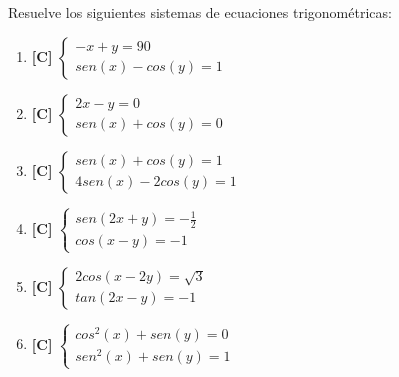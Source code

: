 \Exercicio Resuelve los siguientes sistemas de ecuaciones trigonométricas:

\begin{enumerate}[topsep=0pt]
	\item \textbf{[C]} $ \begin{cases}
		-x + y = 90 \\
		sen(x) - cos(y)= 1
	\end{cases} $
	\item \textbf{[C]} $ \begin{cases}
		2x - y = 0 \\
		sen(x) + cos(y)= 0
	\end{cases} $
	\item \textbf{[C]} $ \begin{cases}
		sen(x) + cos(y) = 1 \\
		4 sen(x) - 2cos(y) = 1
	\end{cases} $
	\item \textbf{[C]} $ \begin{cases}
		sen(2x+y) = -\frac{1}{2} \\
		cos(x-y) = -1
	\end{cases} $
	\item \textbf{[C]} $ \begin{cases}
		2cos(x-2y) = \sqrt{3} \\
		tan(2x-y) = -1
	\end{cases} $
	\item \textbf{[C]} $ \begin{cases}
		cos^2(x) + sen(y) = 0 \\
		sen^2(x) + sen(y) = 1
	\end{cases} $
\end{enumerate}


